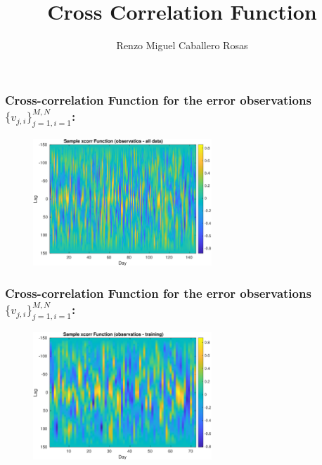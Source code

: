 \documentclass[aspectratio=169]{beamer}\usepackage[utf8]{inputenc}
\title{Cross Correlation Function}
\subtitle{Renzo Miguel Caballero Rosas}
\begin{document}
\begin{frame}
\titlepage
\end{frame}


\begin{frame}\frametitle{Cross-correlation Function for the error observations $\{v_{j,i}\}_{j=1,i=1}^{M,N}$:}

\begin{figure}[ht!]
\centering
\includegraphics[width=0.6\textwidth]{obs_alldata.eps}
\end{figure}

\end{frame}


\begin{frame}\frametitle{Cross-correlation Function for the error observations $\{v_{j,i}\}_{j=1,i=1}^{M,N}$:}

\begin{figure}[ht!]
\centering
\includegraphics[width=0.6\textwidth]{obs_training.eps}
\end{figure}

\end{frame}

\end{document}
